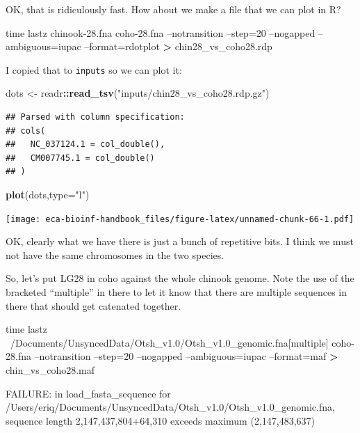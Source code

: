\documentclass[]{krantz}
\makeatletter
\newenvironment{Shaded}{\begin{snugshade}}{\end{snugshade}}
\newcommand{\BuiltInTok}[1]{#1}
\newcommand{\DataTypeTok}[1]{\textcolor[rgb]{0.27,0.27,0.27}{#1}}
\newcommand{\ExtensionTok}[1]{#1}
\newcommand{\KeywordTok}[1]{\textcolor[rgb]{0.27,0.27,0.27}{\textbf{#1}}}
\newcommand{\NormalTok}[1]{#1}
\newcommand{\OperatorTok}[1]{\textcolor[rgb]{0.43,0.43,0.43}{\textbf{#1}}}
\newcommand{\StringTok}[1]{\textcolor[rgb]{0.5,0.5,0.5}{#1}}
\newenvironment{kframe}{%
\medskip{}
\setlength{\fboxsep}{.8em}
 \def\at@end@of@kframe{}%
 \ifinner\ifhmode%
  \def\at@end@of@kframe{\end{minipage}}%
  \begin{minipage}{\columnwidth}%
 \fi\fi%
 \def\FrameCommand##1{\hskip\@totalleftmargin \hskip-\fboxsep
 \colorbox{shadecolor}{##1}\hskip-\fboxsep
     \hskip-\linewidth \hskip-\@totalleftmargin \hskip\columnwidth}%
 \MakeFramed {\advance\hsize-\width
   \@totalleftmargin\z@ \linewidth\hsize
   \@setminipage}}%
 {\par\unskip\endMakeFramed%
 \at@end@of@kframe}
\renewenvironment{Shaded}{\begin{kframe}}{\end{kframe}}
\makeatother
\begin{document}
OK, that is ridiculously fast. How about we make a file that we can plot in R?

\begin{Shaded}
\begin{Highlighting}[]
\BuiltInTok{time}\NormalTok{ lastz chinook-28.fna coho-28.fna --notransition --step=20 --nogapped --ambiguous=iupac --format=rdotplot }\OperatorTok{>}\NormalTok{ chin28_vs_coho28.rdp}
\end{Highlighting}
\end{Shaded}

I copied that to \texttt{inputs} so we can plot it:

\begin{Shaded}
\begin{Highlighting}[]
\NormalTok{dots <-}\StringTok{ }\NormalTok{readr}\OperatorTok{::}\KeywordTok{read_tsv}\NormalTok{(}\StringTok{"inputs/chin28_vs_coho28.rdp.gz"}\NormalTok{)}
\end{Highlighting}
\end{Shaded}

\begin{verbatim}
## Parsed with column specification:
## cols(
##   NC_037124.1 = col_double(),
##   CM007745.1 = col_double()
## )
\end{verbatim}

\begin{Shaded}
\begin{Highlighting}[]
\KeywordTok{plot}\NormalTok{(dots,}\DataTypeTok{type=}\StringTok{"l"}\NormalTok{)}
\end{Highlighting}
\end{Shaded}

\texttt{[image: eca-bioinf-handbook\_files/figure-latex/unnamed-chunk-66-1.pdf]}

OK, clearly what we have there is just a bunch of repetitive bits. I think we must not have the same chromosomes in the two species.

So, let's put LG28 in coho against the whole chinook genome. Note the use of the
bracketed ``multiple'' in there to let it know that there are multiple sequences in there
that should get catenated together.

\begin{Shaded}
\begin{Highlighting}[]
\BuiltInTok{time}\NormalTok{ lastz ~/Documents/UnsyncedData/Otsh_v1.0/Otsh_v1.0_genomic.fna[multiple]  coho-28.fna --notransition --step=20 --nogapped --ambiguous=iupac --format=maf }\OperatorTok{>}\NormalTok{ chin_vs_coho28.maf}

\ExtensionTok{FAILURE}\NormalTok{: in load_fasta_sequence for /Users/eriq/Documents/UnsyncedData/Otsh_v1.0/Otsh_v1.0_genomic.fna, sequence length 2,147,437,804+64,310 exceeds maximum (2,147,483,637)}
\end{Highlighting}
\end{Shaded}
\end{document}
